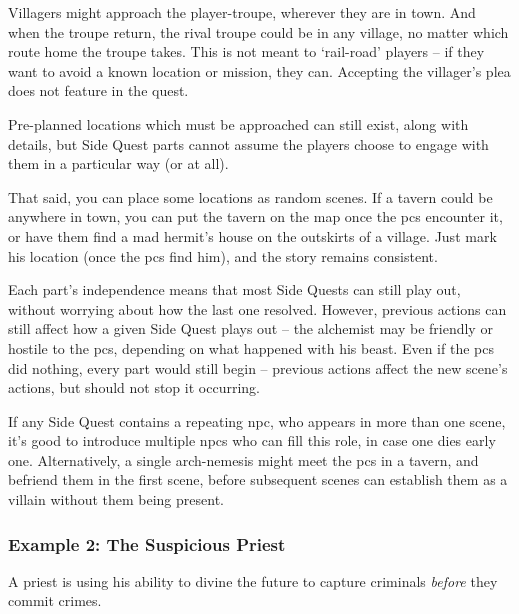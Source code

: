 \begin{multicols}{2}
\begin{enumerate}
\end{enumerate}

Villagers might approach the player-troupe, wherever they are in town.
And when the troupe return, the rival troupe could be in any village, no matter which route home the troupe takes.
This is not meant to `rail-road' players -- if they want to avoid a known location or mission, they can.
Accepting the villager's plea does not feature in the quest.

Pre-planned locations which must be approached can still exist, along with details, but Side Quest parts cannot assume the players choose to engage with them in a particular way (or at all).

That said, you can place some locations as random scenes.
If a tavern could be anywhere in town, you can put the tavern on the map once the \glspl{pc} encounter it, or have them find a mad hermit's house on the outskirts of a village.
Just mark his location (once the \glspl{pc} find him), and the story remains consistent.

Each part's independence means that most Side Quests can still play out, without worrying about how the last one resolved.
However, previous actions can still affect how a given Side Quest plays out -- the alchemist may be friendly or hostile to the \glspl{pc}, depending on what happened with his beast.
Even if the \glspl{pc} did nothing, every part would still begin -- previous actions affect the new scene's actions, but should not stop it occurring.

If any Side Quest contains a repeating \gls{npc}, who appears in more than one scene, it's good to introduce multiple \glspl{npc} who can fill this role, in case one dies early one.
Alternatively, a single arch-nemesis might meet the \glspl{pc} in a tavern, and befriend them in the first scene, before subsequent scenes can establish them as a villain without them being present.

\subsubsection{Example 2: The Suspicious Priest}

\begin{exampletext}

A priest is using his ability to divine the future to capture criminals \emph{before} they commit crimes.

\end{exampletext}


\end{multicols}
